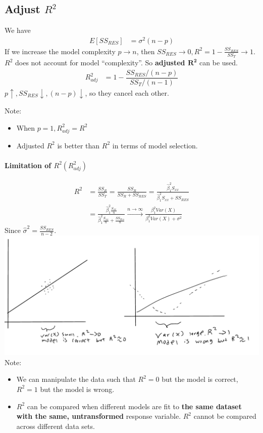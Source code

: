 \documentclass[12 pt]{article}
\begin{document}
  \subsection{Adjust $R^2$}
  We have
  \begin{align*}
    E[SS_{RES}] & = \sigma^2 (n-p)
  \end{align*}
  If we increase the model complexity $p \to n$, then $SS_{RES} \to 0,
  R^2 = 1 - \frac{SS_{RES}}{SS_T} \to 1$.
  \\ $R^2$ does not account for model ``complexity''. So \textbf{adjusted
    $\mathbf{R^2}$} can be used.
  \begin{align*}
    R_{adj}^2 & = 1 - \dfrac{SS_{RES}/(n-p)}{SS_T/(n-1)}
  \end{align*}
  $p \uparrow, SS_{RES} \downarrow, (n-p) \downarrow$, so they cancel
  each other.

  Note:
  \begin{itemize}
  \item When $p = 1, R^2_{adj} = R^2$
  \item Adjusted $R^2$ is better than $R^2$ in terms of model selection.
  \end{itemize}
  \paragraph{Limitation of $R^2(R^2_{adj})$}
  \begin{align*}
    R^2 & = \frac{SS_{R}}{SS_T} = \frac{SS_R}{SS_R + SS_{RES}} = \frac{\hat{\beta}_1^2 S_{xx}}{\hat{\beta}_1^2S_{xx}+ SS_{RES}}
    \\ & = \frac{\hat{\beta}_1^2 \frac{S_{xx}}{n}}{\hat{\beta}_1^2 \frac{S_{xx}}{n} + \frac{SS_{Res}}{n}} \stackrel{n \to \infty}{\to} \frac{\beta_1^2 Var(X)}{\beta_1^2 Var(X) + \sigma^2}
  \end{align*}
  Since $\hat{\sigma}^2 = \frac{SS_{RES}}{n-2}$.
  \\ \includegraphics[width=.9\textwidth]{25.pdf}\\
  Note:
  \begin{itemize}
  \item We can manipulate the data such that $R^2=0$ but the model is
    correct, $R^2 = 1$ but the model is wrong.
  \item $R^2$ can be compared when different models are fit to
    \textbf{the same dataset with the same, untransformed} response
    variable. $R^2$ cannot be compared across different data sets.
  \end{itemize}
\end{document}
